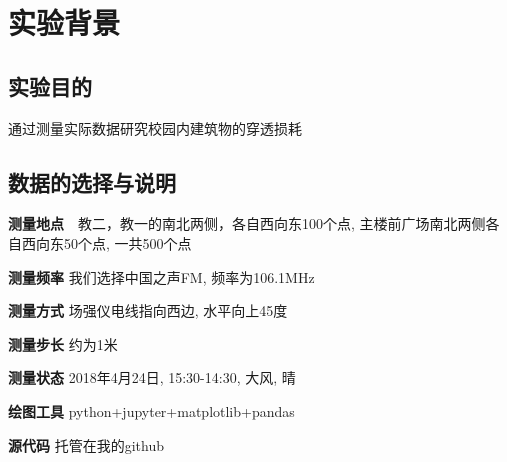 
\section{实验背景}
	\subsection{实验目的}
		通过测量实际数据研究校园内建筑物的穿透损耗
	\subsection{数据的选择与说明}
		\begin{description}
		  \item{\textbf{测量地点}}　教二，教一的南北两侧，各自西向东100个点, 主楼前广场南北两侧各自西向东50个点, 一共500个点
		  \item{\textbf{测量频率}} 我们选择中国之声FM, 频率为106.1MHz
		  \item{\textbf{测量方式}} 场强仪电线指向西边, 水平向上45度
		  \item{\textbf{测量步长}} 约为1米
		  \item{\textbf{测量状态}} 2018年4月24日, 15:30-14:30, 大风, 晴
		  \item{\textbf{绘图工具}} python+jupyter+matplotlib+pandas
		  \item{\textbf{源代码}} 托管在我的github\cite{mygithub}
		\end{description}
	

